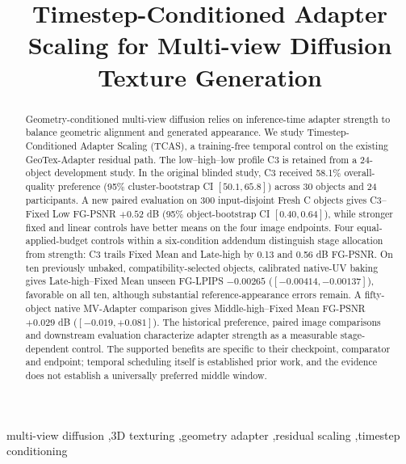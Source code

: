 \documentclass[times,twocolumn,final]{elsarticle}
\begin{document}
\begin{frontmatter}

\title{Timestep-Conditioned Adapter Scaling for Multi-view Diffusion Texture Generation}


\begin{abstract}
Geometry-conditioned multi-view diffusion relies on inference-time adapter strength to balance geometric alignment and generated appearance. We study Timestep-Conditioned Adapter Scaling (TCAS), a training-free temporal control on the existing GeoTex-Adapter residual path. The low--high--low profile C3 is retained from a 24-object development study. In the original blinded study, C3 received 58.1\% overall-quality preference (95\% cluster-bootstrap CI $[50.1,65.8]$) across 30 objects and 24 participants. A new paired evaluation on 300 input-disjoint Fresh C objects gives C3--Fixed Low FG-PSNR $+0.52$ dB (95\% object-bootstrap CI $[0.40,0.64]$), while stronger fixed and linear controls have better means on the four image endpoints. Four equal-applied-budget controls within a six-condition addendum distinguish stage allocation from strength: C3 trails Fixed Mean and Late-high by 0.13 and 0.56 dB FG-PSNR. On ten previously unbaked, compatibility-selected objects, calibrated native-UV baking gives Late-high--Fixed Mean unseen FG-LPIPS $-0.00265$ ($[-0.00414,-0.00137]$), favorable on all ten, although substantial reference-appearance errors remain. A fifty-object native MV-Adapter comparison gives Middle-high--Fixed Mean FG-PSNR $+0.029$ dB ($[-0.019,+0.081]$). The historical preference, paired image comparisons and downstream evaluation characterize adapter strength as a measurable stage-dependent control. The supported benefits are specific to their checkpoint, comparator and endpoint; temporal scheduling itself is established prior work, and the evidence does not establish a universally preferred middle window.
\end{abstract}

\begin{keyword}
\KWD
multi-view diffusion \sep 3D texturing \sep geometry adapter \sep residual scaling \sep timestep conditioning
\end{keyword}

\end{frontmatter}

\linenumbers
\end{document}
